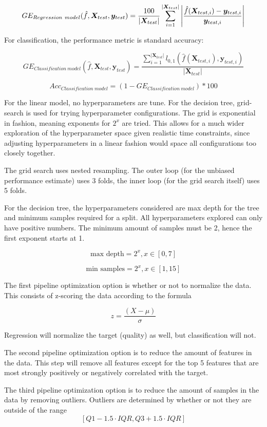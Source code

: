 \documentclass[12pt, letterpaper]{article}
\begin{document}
$$
    GE_{Regression\ model}(\hat{f}, \bm{X}_{test}, \bm{y}_{test}) = \frac{100}{|\bm{X}_{test}|} \sum_{i=1}^{|\bm{X}_{test}|} \abs{\frac{\hat{f}(\bm{X}_{test,i}) - \bm{y}_{test,i}}{\bm{y}_{test,i}}}
$$

For classification, the performance metric is standard accuracy:

$$
    GE_{Classification\ model}(\hat{f}, \bm{X}_{test}, \bm{y}_{test}) = \frac{\sum_{i=1}^{|\bm{X}_{test}|}l_{0,1}(\hat{f}(\bm{X}_{test,i}), \bm{y}_{test,i})}{|\bm{X}_{test}|}
$$

$$
Acc_{Classification\ model} = (1 - GE_{Classification\ model}) * 100
$$

For the linear model, no hyperparameters are tune. For the decision tree, grid-search is used for trying hyperparameter configurations. The grid is exponential in fashion, meaning exponents for $2^x$ are tried. This allows for a much wider exploration of the hyperparameter space given realistic time constraints, since adjusting hyperparameters in a linear fashion would space all configurations too closely together.

The grid search uses nested resampling. The outer loop (for the unbiased performance estimate) uses 3 folds, the inner loop (for the grid search itself) uses 5 folds.

For the decision tree, the hyperparameters considered are max depth for the tree and minimum samples required for a split. All hyperparameters explored can only have positive numbers. The minimum amount of samples must be 2, hence the first exponent starts at 1.

$$
\text{max depth} = 2^x, x \in [0,7]
$$

$$
\text{min samples} = 2^x, x \in [1,15]
$$

The first pipeline optimization option is whether or not to normalize the data. This consists of z-scoring the data according to the formula

$$
z = \frac{(X - \mu)}{\sigma}
$$

Regression will normalize the target (quality) as well, but classification will not.

The second pipeline optimization option is to reduce the amount of features in the data. This step will remove all features except for the top 5 features that are most strongly positively or negatively correlated with the target.

The third pipeline optimization option is to reduce the amount of samples in the data by removing outliers. Outliers are determined by whether or not they are outside of the range
$$
[Q1 - 1.5 \cdot IQR, Q3 + 1.5 \cdot IQR]
$$
\end{document}
